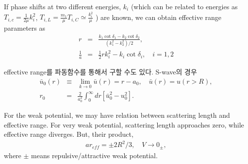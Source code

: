 \documentclass[10pt]{book}
\newcommand{\bea}{\begin{eqnarray}}
\newcommand{\eea}{\end{eqnarray}}
\newcommand{\no}{\nonumber \\}
\begin{document}
If phase shifts at two different energies, $k_i$
(which can be related to energies as 
$T_{i,c}=\frac{1}{2\mu}k_i^2$, $T_{i,L}=\frac{m_1}{\mu}T_{i,C}\simeq \frac{k_i^2}{\mu}$
 ) are known, we can obtain 
effective range parameters as
\bea
r&=&\frac{ k_1 \cot\delta_1-k_2\cot\delta_2  }{(k_1^2-k_2^2)/2},\no
\frac{1}{a}&=&\frac{1}{2}r k_i^2-k_i\cot\delta_i,\quad
i=1,2
\eea

effective range를 파동함수를 통해서 구할 수도 있다. S-wave의 경우
\bea
\bar{u}_0(r)&\equiv& \lim_{k\to 0} \bar{u}(r)=r-a_0, \quad \bar{u}(r)=u(r>R),\no
r_0&=& \frac{2}{a_0^2}\int_0^\infty dr [\bar{u}_0^2-u_0^2].
\eea

For the weak potential, we may have relation between scattering length and effective range.
For very weak potential, scattering length approaches zero, while effective range diverges.
But, their product, 
\bea 
a r_{eff} = \pm 2 R^2/3 ,\quad V\to 0_{\pm},
\eea  
where $\pm$ means repulsive/attractive weak potential.  
\end{document}
